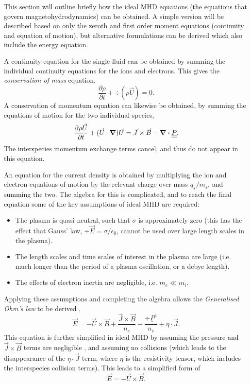This section will outline briefly how the ideal MHD equations (the equations that govern magnetohydrodynamics) can be obtained. A simple version will be described based on only the zeroth and first order moment equations (continuity and equation of motion), but alternative formulations can be derived which also include the energy equation. 

A continuity equation for the single-fluid can be obtained by summing the individual continuity equations for the ions and electrons. This gives the \textit{conservation of mass} equation,
\begin{equation} \frac{\partial \rho}{\partial t} + \div (\rho \vec{U}) = 0. \end{equation}
A conservation of momentum equation can likewise be obtained, by summing the equations of motion for the two individual species,
\begin{equation} \frac{\partial \rho \vec{U}}{\partial t} + (\vec{U} \cdot \grad)\vec{U} =\vec{J} \times \vec{B} - \div \underline{\underline{P}} .\end{equation}
The interspecies momentum exchange terms cancel, and thus do not appear in this equation.

An equation for the current density is obtained by multiplying the ion and electron equations of motion by the relevant charge over mass $q_s/m_s$, and summing the two. The algebra for this is complicated, and to reach the final equation some of the key assumptions of ideal MHD are required:
\begin{itemize}
	\item{The plasma is quasi-neutral, such that $\sigma$ is approximately zero (this has the effect that Gauss' law, $\div \vec{E} = \sigma / \epsilon_0$, cannot be used over large length scales in the plasma).}
	\item{The length scales and time scales of interest in the plasma are large (i.e. much longer than the period of a plasma oscillation, or a debye length).}
	\item{The effects of electron inertia are negligible, i.e. $m_e \ll m_i$.}
\end{itemize}
Applying these assumptions and completing the algebra allows the \textit{Generalised Ohm's law} to be derived \cite{Piel2017, Chen2015}, 
\begin{equation} \vec{E} = -\vec{U}\times\vec{B} + \frac{\vec{J} \times \vec{B}}{n_e} - \frac{\div \underline{\underline{P}}^e}{n_e} + \eta \cdot \vec{J}. \end{equation}
This equation is further simplified in ideal MHD by assuming the pressure and $\vec{J} \times \vec{B}$ terms are negligible \cite{Chen2015}, and assuming no collisions (which leads to the disappearance of the $\eta \cdot \vec{J}$ term, where $\eta$ is the resistivity tensor, which includes the interspecies collision terms). This leads to a simplified form of 
\begin{equation} \vec{E} = -\vec{U}\times\vec{B} . \end{equation}

